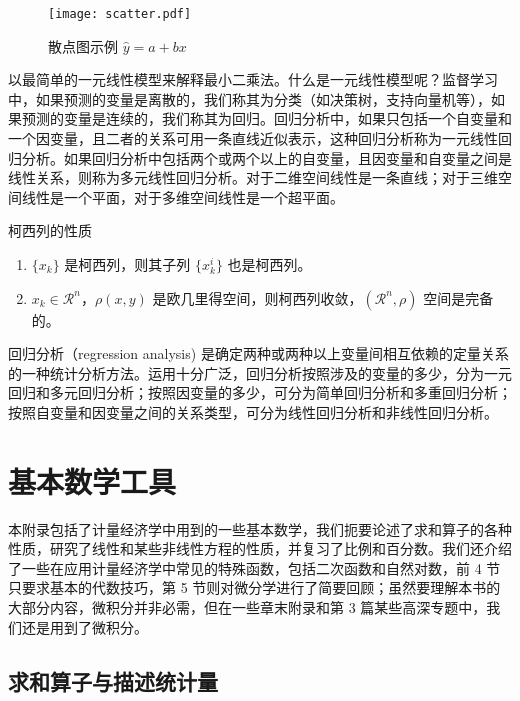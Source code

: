 \documentclass[cn,11pt,fancy,hide]{elegantbook}
\begin{document}
\begin{figure}[htbp]
	\centering
	\texttt{[image: scatter.pdf]}
	\caption{散点图示例 $\hat{y}=a+bx$ \label{fig:scatter}}
\end{figure}

以最简单的一元线性模型来解释最小二乘法。什么是一元线性模型呢？监督学习中，如果预测的变量是离散的，我们称其为分类（如决策树，支持向量机等），如果预测的变量是连续的，我们称其为回归。回归分析中，如果只包括一个自变量和一个因变量，且二者的关系可用一条直线近似表示，这种回归分析称为一元线性回归分析。如果回归分析中包括两个或两个以上的自变量，且因变量和自变量之间是线性关系，则称为多元线性回归分析。对于二维空间线性是一条直线；对于三维空间线性是一个平面，对于多维空间线性是一个超平面。

\begin{property}\label{property:cauchy}
柯西列的性质
\begin{enumerate}
\item $\{x_k\}$ 是柯西列，则其子列 $\{x_k^i\}$ 也是柯西列。
\item $x_k\in \mathcal{R}^n$，$\rho(x,y)$ 是欧几里得空间，则柯西列收敛，$(\mathcal{R}^n,\rho)$ 空间是完备的。
\end{enumerate}
\end{property}

\begin{conclusion}
回归分析（regression analysis) 是确定两种或两种以上变量间相互依赖的定量关系的一种统计分析方法。运用十分广泛，回归分析按照涉及的变量的多少，分为一元回归和多元回归分析；按照因变量的多少，可分为简单回归分析和多重回归分析；按照自变量和因变量之间的关系类型，可分为线性回归分析和非线性回归分析。
\end{conclusion}


\nocite{*} 



\appendix
\chapter{基本数学工具}

本附录包括了计量经济学中用到的一些基本数学，我们扼要论述了求和算子的各种性质，研究了线性和某些非线性方程的性质，并复习了比例和百分数。我们还介绍了一些在应用计量经济学中常见的特殊函数，包括二次函数和自然对数，前 4 节只要求基本的代数技巧，第 5 节则对微分学进行了简要回顾；虽然要理解本书的大部分内容，微积分并非必需，但在一些章末附录和第 3 篇某些高深专题中，我们还是用到了微积分。

\section{求和算子与描述统计量}
\end{document}
